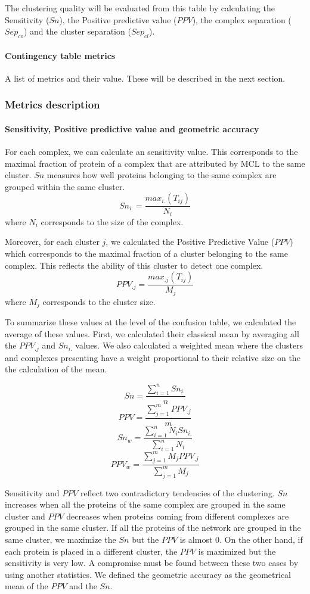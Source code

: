 The clustering quality will be evaluated from this table by calculating the Sensitivity ($Sn$), the Positive predictive
value ($PPV$), the complex separation ($Sep_{co}$) and the cluster separation ($Sep_{cl}$).

\paragraph{Contingency table metrics}
  A list of metrics and their value. These will be described in the next section.

\subsubsection{Metrics description}
\paragraph{Sensitivity, Positive predictive value and geometric accuracy}

For each complex, we can calculate an sensitivity value. This corresponds to the maximal fraction of protein of a complex that are attributed by MCL to the same cluster. $Sn$ measures how well proteins belonging to the same complex are grouped within the same cluster.
\[Sn_{i.}=\frac{max_{i.}(T_{ij})}{N_i}\]
where $N_i$ corresponds to the size of the complex.

Moreover, for each cluster $j$, we calculated the Positive Predictive Value ($PPV$) which corresponds to the maximal fraction of a cluster belonging to the same complex. This reflects the ability of this cluster to detect one complex.
\[PPV_{.j}=\frac{max_{.j}(T_{ij})}{M_j}\]
where $M_j$ corresponds to the cluster size.

To summarize these values at the level of the confusion table, we calculated the average of these values. 
First, we calculated their classical mean by averaging all the $PPV_{.j}$ and $Sn_{i.}$ values. We also calculated a weighted mean where the clusters and complexes presenting have a weight proportional to their relative size on the the calculation of the mean.

\[Sn = \frac{\sum_{i=1}^nSn_{i.}}{n}\]
\[PPV = \frac{\sum_{j=1}^mPPV_{.j}}{m}\]
\[Sn_w = \frac{\sum_{i=1}^nN_iSn_{i.}}{\sum_{i=1}^nN_i}\]
\[PPV_w = \frac{\sum_{j=1}^mM_jPPV_{.j}}{\sum_{j=1}^mM_j}\]

Sensitivity and $PPV$ reflect two contradictory tendencies of the clustering. $Sn$ increases when all the proteins of the same complex are grouped in the same cluster and $PPV$ decreases when proteins coming from different complexes are grouped in the same cluster. If all the proteins of the network are grouped in the same cluster, we maximize the $Sn$ but the $PPV$ is almost 0. On the other hand, if each protein is placed in a different cluster, the $PPV$ is maximized  but the sensitivity is very low. A compromise must be found between these two cases by using another statistics. We defined the geometric accuracy as the geometrical mean of the $PPV$ and the $Sn$.

